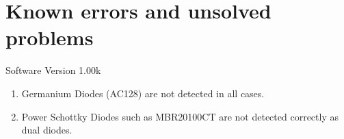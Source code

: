 
\chapter{Known errors and unsolved problems}
{\center Software Version 1.00k}

\begin{enumerate}

\item Germanium Diodes (AC128) are not detected in all cases.

\item Power Schottky Diodes such as MBR20100CT are not detected correctly as dual diodes.

\end{enumerate}
